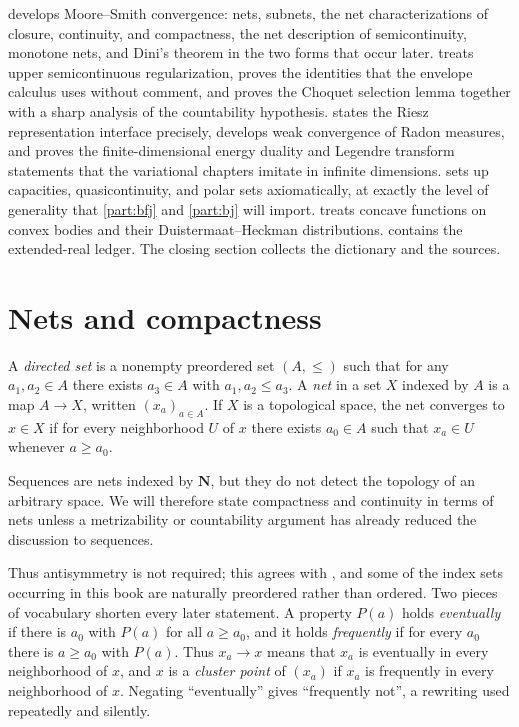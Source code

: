  develops Moore--Smith convergence: nets, subnets,
the net characterizations of closure, continuity, and compactness, the net
description of semicontinuity, monotone nets, and Dini's theorem in the two
forms that occur later.
 treats upper semicontinuous regularization, proves
the identities that the envelope calculus uses without comment, and proves the
Choquet selection lemma together with a sharp analysis of the countability
hypothesis.
 states the Riesz representation interface precisely,
develops weak convergence of Radon measures, and proves the finite-dimensional
energy duality and Legendre transform statements that the variational chapters
imitate in infinite dimensions.
 sets up capacities, quasicontinuity, and polar
sets axiomatically, at exactly the level of generality that \cref{part:bfj}
and \cref{part:bj} will import.
 treats concave functions on convex bodies and their
Duistermaat--Heckman distributions.
 contains the extended-real ledger.
The closing section collects the dictionary and the sources.

\section{Nets and compactness}
\label{sec:nets-compactness}

\begin{definition}
\label{def:directed-net}
A \emph{directed set} is a nonempty preordered set $(A,\leq)$ such that for any
$a_1,a_2\in A$ there exists $a_3\in A$ with $a_1,a_2\leq a_3$.  A \emph{net}
in a set $X$ indexed by $A$ is a map $A\to X$, written $(x_a)_{a\in A}$.
If $X$ is a topological space, the net converges to $x\in X$ if for every
neighborhood $U$ of $x$ there exists $a_0\in A$ such that $x_a\in U$ whenever
$a\geq a_0$.
\end{definition}

Sequences are nets indexed by $\mathbf N$, but they do not detect the topology
of an arbitrary space.  We will therefore state compactness and continuity in
terms of nets unless a metrizability or countability argument has already
reduced the discussion to sequences.

Thus antisymmetry is not required; this agrees with
, and some of the index sets occurring in this book
are naturally preordered rather than ordered.  Two pieces of vocabulary
shorten every later statement.  A property $P(a)$ holds
\emph{eventually} if there is $a_0$ with $P(a)$ for all $a\geq a_0$, and it
holds \emph{frequently} if for every $a_0$ there is $a\geq a_0$ with $P(a)$.
Thus $x_a\to x$ means that $x_a$ is eventually in every neighborhood of $x$,
and $x$ is a \emph{cluster point} of $(x_a)$ if $x_a$ is frequently in every
neighborhood of $x$.  Negating ``eventually'' gives ``frequently not'', a
rewriting used repeatedly and silently.

